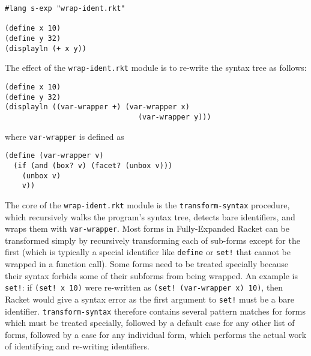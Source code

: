 \documentclass{article}
\begin{document}
\begin{lstlisting}
#lang s-exp "wrap-ident.rkt"

(define x 10)
(define y 32)
(displayln (+ x y))
\end{lstlisting}

The effect of the \texttt{wrap-ident.rkt} module is to re-write the syntax tree as follows:

\begin{lstlisting}
(define x 10)
(define y 32)
(displayln ((var-wrapper +) (var-wrapper x)
                               (var-wrapper y)))
\end{lstlisting}

where \texttt{var-wrapper} is defined as

\begin{lstlisting}
(define (var-wrapper v)
  (if (and (box? v) (facet? (unbox v)))
    (unbox v)
    v))
\end{lstlisting}

The core of the \texttt{wrap-ident.rkt} module is the \texttt{transform-syntax} procedure, which recursively walks the program's syntax tree, detects bare identifiers, and wraps them with \texttt{var-wrapper}. Most forms in Fully-Expanded Racket can be transformed simply by recursively transforming each of sub-forms except for the first (which is typically a special identifier like \texttt{define} or \texttt{set!} that cannot be wrapped in a function call). Some forms need to be treated specially because their syntax forbids some of their subforms from being wrapped. An example is \texttt{set!}: if \texttt{(set! x 10)} were re-written as \texttt{(set! (var-wrapper x) 10)}, then Racket would give a syntax error as the first argument to \texttt{set!} must be a bare identifier. \texttt{transform-syntax} therefore contains several pattern matches for forms which must be treated specially, followed by a default case for any other list of forms, followed by a case for any individual form, which performs the actual work of identifying and re-writing identifiers.
\end{document}
